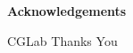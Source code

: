 \begin{acknowledgementsen}
\begin{center}
\bfseries
\LARGE{Acknowledgements}
\end{center}
\bigskip
\bigskip
CGLab Thanks You


\end{acknowledgementsen}
